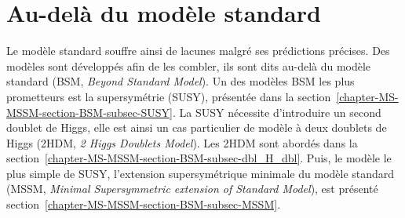 \section{Au-delà du modèle standard}\label{chapter-MS-MSSM-section-BSM}
Le modèle standard souffre ainsi de lacunes malgré ses prédictions précises.
Des modèles sont développés afin de les combler, ils sont dits \og au-delà \fg{} du modèle standard (BSM, \emph{Beyond Standard Model}).
Un des modèles BSM les plus prometteurs est la supersymétrie (SUSY), présentée dans la section~\ref{chapter-MS-MSSM-section-BSM-subsec-SUSY}.
La SUSY nécessite d'introduire un second doublet de Higgs, elle est ainsi un cas particulier de modèle à deux doublets de Higgs (2HDM, \emph{2 Higgs Doublets Model}).
Les 2HDM sont abordés dans la section~\ref{chapter-MS-MSSM-section-BSM-subsec-dbl_H_dbl}.
Puis, le modèle le plus simple de SUSY, l'extension supersymétrique minimale du modèle standard (MSSM, \emph{Minimal Supersymmetric extension of Standard Model}), est présenté section~\ref{chapter-MS-MSSM-section-BSM-subsec-MSSM}.
